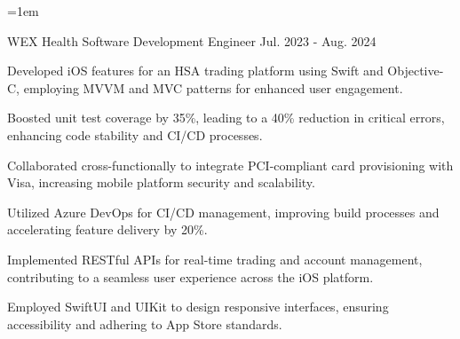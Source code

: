 

\emergencystretch=1em   %
\sloppy                 %

\begin{cventries}

        \cventry
          {WEX Health} %
          {Software Development Engineer} %
          {} %
          {Jul. 2023 - Aug. 2024} %
          {
            \begin{cvitems} %
            \item {Developed iOS features for an HSA trading platform using Swift and Objective-C, employing MVVM and MVC patterns for enhanced user engagement.}
    \item {Boosted unit test coverage by 35\%, leading to a 40\% reduction in critical errors, enhancing code stability and CI/CD processes.}
    \item {Collaborated cross-functionally to integrate PCI-compliant card provisioning with Visa, increasing mobile platform security and scalability.}
    \item {Utilized Azure DevOps for CI/CD management, improving build processes and accelerating feature delivery by 20\%.}
    \item {Implemented RESTful APIs for real-time trading and account management, contributing to a seamless user experience across the iOS platform.}
    \item {Employed SwiftUI and UIKit to design responsive interfaces, ensuring accessibility and adhering to App Store standards.}
            \end{cvitems}
          }


\end{cventries}
